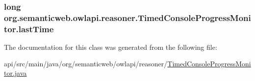 \hypertarget{classorg_1_1semanticweb_1_1owlapi_1_1reasoner_1_1_timed_console_progress_monitor_a56c23963a9278be3e9906590920b2473}{
\subsubsection[{last\-Time}]{\setlength{\rightskip}{0pt plus 5cm}long org.\-semanticweb.\-owlapi.\-reasoner.\-Timed\-Console\-Progress\-Monitor.\-last\-Time\hspace{0.3cm}{\ttfamily [private]}}}\label{classorg_1_1semanticweb_1_1owlapi_1_1reasoner_1_1_timed_console_progress_monitor_a56c23963a9278be3e9906590920b2473}


The documentation for this class was generated from the following file\-:\begin{DoxyCompactItemize}
\item 
api/src/main/java/org/semanticweb/owlapi/reasoner/\hyperlink{_timed_console_progress_monitor_8java}{Timed\-Console\-Progress\-Monitor.\-java}\end{DoxyCompactItemize}
